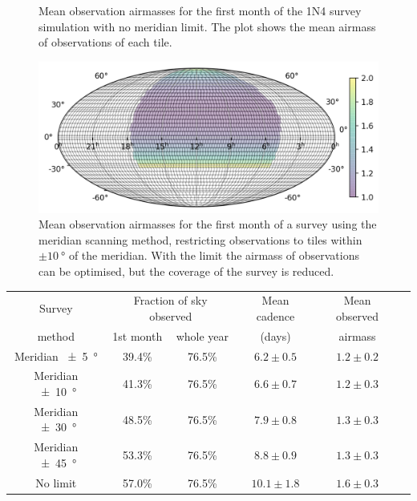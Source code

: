 \begin{colsection}
\begin{colsection}
\begin{figure}[p]
    \caption[Mean observation airmasses for the 1N4 survey simulation]{
        Mean observation airmasses for the first month of the 1N4 survey simulation with no meridian limit. The plot shows the mean airmass of observations of each tile.
    }\label{fig:survey_sim_airmass_normal}
\end{figure}

\begin{figure}[p]
    \begin{center}
        \includegraphics[width=0.7\linewidth]{images/survey_sims/30_1N4_meridian_airmass.png}
    \end{center}

    \caption[Mean observation airmasses using the meridian scanning method]{
        Mean observation airmasses for the first month of a survey using the meridian scanning method, restricting observations to tiles within $\pm\SI{10}{\degree}$ of the meridian. With the limit the airmass of observations can be optimised, but the coverage of the survey is reduced.
    }\label{fig:survey_sim_airmass_meridian}
\end{figure}

\clearpage

\begin{table}[t]
    \begin{center}
    \begin{tabular}{c|cc|c|c|c} %

    Survey &
    \multicolumn{2}{c|}{Fraction of sky observed} &
    Mean cadence &
    Mean observed
    \\
    method &
    1st month &
    whole year &
    (days) &
    airmass
    \\
    \midrule
    Meridian  \SI{\pm5}{\degree} & 39.4\% & 76.5\% &  $6.2\pm0.5$ & $1.2\pm0.2$ \\
    Meridian \SI{\pm10}{\degree} & 41.3\% & 76.5\% &  $6.6\pm0.7$ & $1.2\pm0.3$ \\
    Meridian \SI{\pm30}{\degree} & 48.5\% & 76.5\% &  $7.9\pm0.8$ & $1.3\pm0.3$ \\
    Meridian \SI{\pm45}{\degree} & 53.3\% & 76.5\% &  $8.8\pm0.9$ & $1.3\pm0.3$ \\
    No limit                     & 57.0\% & 76.5\% & $10.1\pm1.8$ & $1.6\pm0.3$ \\


\end{tabular}
\end{center}
\end{table}
\end{colsection}
\end{colsection}
